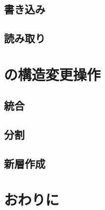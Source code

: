 \subsection{書き込み}

\subsection{読み取り}

\section{\Bcforest{}の構造変更操作}
\label{sec:smo}

\subsection{統合}
\subsection{分割}
\subsection{新層作成}

\section{おわりに}
\label{sec:conclusion}

